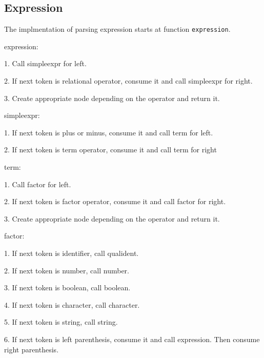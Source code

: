\documentclass[12pt]{article}
\begin{document}
\subsection{Expression}
\begin{MyIndentedList}
    \item The implmentation of parsing expression starts at function \texttt{expression}.
    \item expression:
    \begin{MyIndentedList}
        \item 1. Call simpleexpr for left.
        \item 2. If next token is relational operator, consume it and call simpleexpr for right.
        \item 3. Create appropriate node depending on the operator and return it.
    \end{MyIndentedList}
    \item simpleexpr:
    \begin{MyIndentedList}
        \item 1. If next token is plus or minus, consume it and call term for left.
        \item 2. If next token is term operator, consume it and call term for right 
    \end{MyIndentedList}
    \item term:
    \begin{MyIndentedList}
        \item 1. Call factor for left.
        \item 2. If next token is factor operator, consume it and call factor for right.
        \item 3. Create appropriate node depending on the operator and return it.
    \end{MyIndentedList}
    \item factor:
    \begin{MyIndentedList}
        \item 1. If next token is identifier, call qualident.
        \item 2. If next token is number, call number.
        \item 3. If next token is boolean, call boolean.
        \item 4. If next token is character, call character.
        \item 5. If next token is string, call string.
        \item 6. If next token is left parenthesis, consume it and call expression. Then consume right parenthesis.

\end{MyIndentedList}
\end{MyIndentedList}
\end{document}
